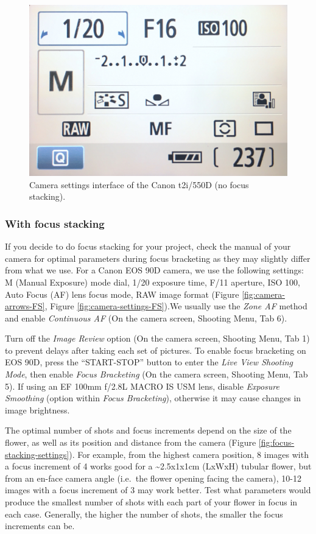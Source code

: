 \documentclass[
]{book}
\begin{document}
\begin{figure}

{\centering \includegraphics[width=0.5\linewidth]{Figures/camera_settings} 

}

\caption{Camera settings interface of the Canon t2i/550D (no focus stacking).}\label{fig:camera-settings-no-FS}
\end{figure}

\hypertarget{with-focus-stacking}{%
\subsubsection{With focus stacking}\label{with-focus-stacking}}

If you decide to do focus stacking for your project, check the manual of your camera for optimal parameters during focus bracketing as they may slightly differ from what we use. For a Canon EOS 90D camera, we use the following settings: M (Manual Exposure) mode dial, 1/20 exposure time, F/11 aperture, ISO 100, Auto Focus (AF) lens focus mode, RAW image format (Figure \ref{fig:camera-arrows-FS}, Figure \ref{fig:camera-settings-FS}).We usually use the \emph{Zone AF} method and enable \emph{Continuous AF} (On the camera screen, Shooting Menu, Tab 6).

Turn off the \emph{Image Review} option (On the camera screen, Shooting Menu, Tab 1) to prevent delays after taking each set of pictures. To enable focus bracketing on EOS 90D, press the ``START-STOP'' button to enter the \emph{Live View Shooting Mode}, then enable \emph{Focus Bracketing} (On the camera screen, Shooting Menu, Tab 5). If using an EF 100mm f/2.8L MACRO IS USM lens, disable \emph{Exposure Smoothing} (option within \emph{Focus Bracketing}), otherwise it may cause changes in image brightness.

The optimal number of shots and focus increments depend on the size of the flower, as well as its position and distance from the camera (Figure \ref{fig:focus-stacking-settings}). For example, from the highest camera position, 8 images with a focus increment of 4 works good for a \textasciitilde2.5x1x1cm (LxWxH) tubular flower, but from an en-face camera angle (i.e.~the flower opening facing the camera), 10-12 images with a focus increment of 3 may work better. Test what parameters would produce the smallest number of shots with each part of your flower in focus in each case. Generally, the higher the number of shots, the smaller the focus increments can be.
\end{document}
